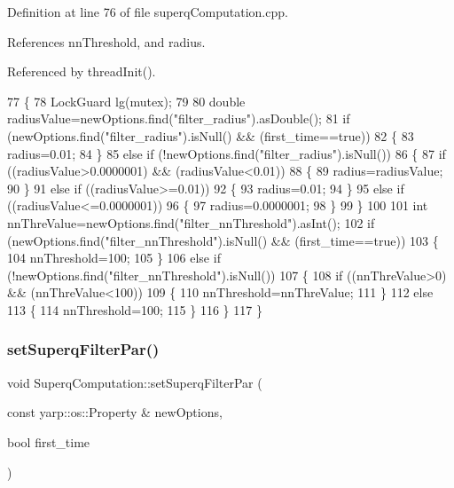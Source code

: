 Definition at line 76 of file superq\+Computation.\+cpp.



References nn\+Threshold, and radius.



Referenced by thread\+Init().


\begin{DoxyCode}
77 \{
78     LockGuard lg(mutex);
79 
80     \textcolor{keywordtype}{double} radiusValue=newOptions.find(\textcolor{stringliteral}{"filter\_radius"}).asDouble();
81     \textcolor{keywordflow}{if} (newOptions.find(\textcolor{stringliteral}{"filter\_radius"}).isNull() && (first\_time==\textcolor{keyword}{true}))
82     \{
83         radius=0.01;
84     \}
85     \textcolor{keywordflow}{else} \textcolor{keywordflow}{if} (!newOptions.find(\textcolor{stringliteral}{"filter\_radius"}).isNull())
86     \{
87         \textcolor{keywordflow}{if} ((radiusValue>0.0000001) && (radiusValue<0.01))
88         \{
89             radius=radiusValue;
90         \}
91         \textcolor{keywordflow}{else} \textcolor{keywordflow}{if} ((radiusValue>=0.01))
92         \{
93             radius=0.01;
94         \}
95         \textcolor{keywordflow}{else} \textcolor{keywordflow}{if} ((radiusValue<=0.0000001))
96         \{
97             radius=0.0000001;
98         \}
99     \}
100 
101    \textcolor{keywordtype}{int} nnThreValue=newOptions.find(\textcolor{stringliteral}{"filter\_nnThreshold"}).asInt();
102     \textcolor{keywordflow}{if} (newOptions.find(\textcolor{stringliteral}{"filter\_nnThreshold"}).isNull() && (first\_time==\textcolor{keyword}{true}))
103     \{
104         nnThreshold=100;
105     \}
106     \textcolor{keywordflow}{else} \textcolor{keywordflow}{if} (!newOptions.find(\textcolor{stringliteral}{"filter\_nnThreshold"}).isNull())
107     \{
108         \textcolor{keywordflow}{if} ((nnThreValue>0) && (nnThreValue<100))
109         \{
110                 nnThreshold=nnThreValue;
111         \}
112         \textcolor{keywordflow}{else}
113         \{
114             nnThreshold=100;
115         \}
116     \}
117 \}
\end{DoxyCode}
\mbox{\label{classSuperqComputation_ac0eb6516ba435573f74b03ed4177d8d0}} 
\subsubsection{\texorpdfstring{set\+Superq\+Filter\+Par()}{setSuperqFilterPar()}}
{\footnotesize\ttfamily void Superq\+Computation\+::set\+Superq\+Filter\+Par (\begin{DoxyParamCaption}\item[{const yarp\+::os\+::\+Property \&}]{new\+Options,  }\item[{bool}]{first\+\_\+time }\end{DoxyParamCaption})}



